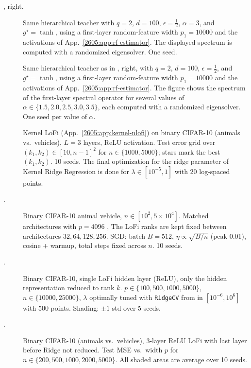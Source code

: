 \begin{description}
\item[, right.]
    Same hierarchical teacher with $q=2$, $d=100$, $\epsilon=\tfrac12$, $\alpha=3$, and $g^\star=\tanh$, using a first-layer random-feature width $p_1=10000$ and the activations of App.~\ref{2605:app:rf-estimator}. The displayed spectrum is computed with a randomized eigensolver.
    One seed.
    
\item[]
  Same hierarchical teacher as in , right, with $q=2$, $d=100$, $\epsilon=\tfrac12$, and $g^\star=\tanh$, using a first-layer random-feature width $p_1=10000$ and the activations of App.~\ref{2605:app:rf-estimator}. The figure shows the spectrum of the first-layer spectral operator for several values of $\alpha \in \{1.5, 2.0, 2.5, 3.0, 3.5\}$, each computed with a randomized eigensolver. One seed per value of $\alpha$.

  \item[]
    Kernel LoFi (App.~\ref{2605:app:kernel-nlofi}) on binary CIFAR-10 (animals vs.\ vehicles), $L=3$ layers, ReLU activation. Test error grid over $(k_1,k_2)\in[10,n-1]^2$ for $n\in\{1000,5000\}$; stars mark the best $(k_1,k_2)$. 10 seeds. The final optimization for the ridge parameter of Kernel Ridge Regression is done for $\lambda \in [10^{-5}, 1]$ with 20 log-spaced points.

  \item[.]
    Binary CIFAR-10 animal vehicle, $n\in[10^2,5\times 10^4]$. Matched architectures with
    $p=4096$ , The LoFi ranks are kept fixed between architectures $32,64,128,256$. SGD: batch $B=512$,
    $\eta\propto\sqrt{B/n}$ (peak 0.01), cosine + warmup, total steps fixed
    across $n$. 10 seeds. 

  \item[.]
    Binary CIFAR-10, single LoFi hidden layer (ReLU), only the hidden
    representation reduced to rank $k$. $p\in\{100, 500, 1000, 5000\}$,
    $n\in\{10000,25000\}$, $\lambda$ optimally tuned with \texttt{RidgeCV} from \cite{pedregosa2011scikit} in $[10^{-6}, 10^{6}]$ with $500$ points. Shading: $\pm 1$ std over 5 seeds.

  \item[.]
    Binary CIFAR-10 (animals vs.\ vehicles), 3-layer ReLU LoFi with last layer before Ridge not reduced. Test MSE vs.\ width $p$ for $n\in\{200,500,1000,2000,5000\}$. All shaded areas are average over 10 seeds.


\end{description}
